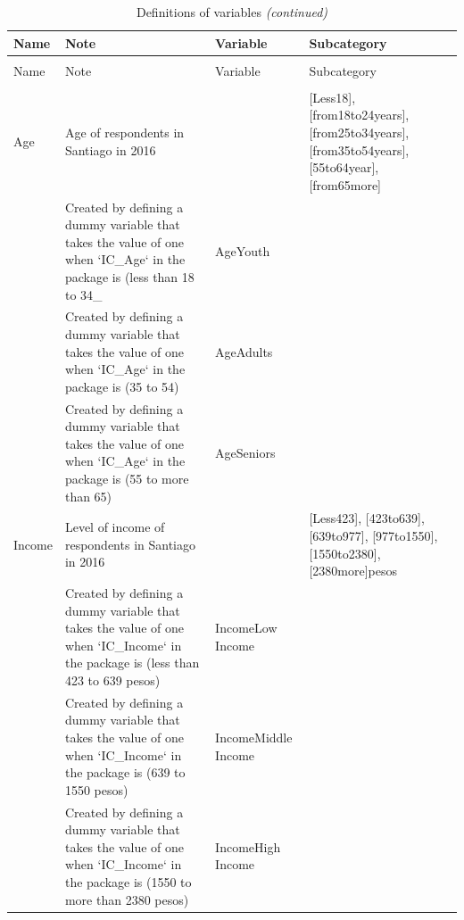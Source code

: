 \documentclass[
11pt, %
oneside, %
english, %
singlespacing, %
]{macthesis} %
\begin{document}
\begingroup\fontsize{8}{10}\selectfont
\begin{longtable}[t]{l>{\raggedright\arraybackslash}p{10em}>{\raggedright\arraybackslash}p{10em}>{\raggedright\arraybackslash}p{10em}}
\caption{\label{tab:unnamed-chunk-21}\label{tab:Definitions}Definitions of variables}\\
\toprule
Name & Note & Variable & Subcategory\\
\midrule
\endfirsthead
\caption[]{\label{tab:unnamed-chunk-21}Definitions of variables \textit{(continued)}}\\
\toprule
Name & Note & Variable & Subcategory\\
\midrule
\endhead

\endfoot
\bottomrule
\endlastfoot
\addlinespace[0.3em]
\multicolumn{4}{l}{\textbf{Socio-Economic and Demographic Attributes}}\\
\hspace{1em}Age & Age of respondents in Santiago in 2016 &  & {}[Less18], [from18to24years], [from25to34years], [from35to54years], [55to64year], [from65more]\\
\hspace{1em} & Created by defining a dummy variable that takes the value of one when `IC\_Age` in the package is (less than 18 to 34\_ & AgeYouth & \\
\hspace{1em} & Created by defining a dummy variable that takes the value of one when `IC\_Age` in the package is (35 to 54) & AgeAdults & \\
\hspace{1em} & Created by defining a dummy variable that takes the value of one when `IC\_Age` in the package is (55 to more than 65) & AgeSeniors & \\
\hspace{1em}Income & Level of income of respondents in Santiago in 2016 &  & {}[Less423], [423to639], [639to977], [977to1550], [1550to2380], [2380more]pesos\\
\hspace{1em} & Created by defining a dummy variable that takes the value of one when `IC\_Income` in the package is (less than 423 to 639 pesos) & IncomeLow Income & \\
\hspace{1em} & Created by defining a dummy variable that takes the value of one when `IC\_Income` in the package is (639 to 1550 pesos) & IncomeMiddle Income & \\
\hspace{1em} & Created by defining a dummy variable that takes the value of one when `IC\_Income` in the package is (1550 to more than 2380 pesos) & IncomeHigh Income & \\

\end{longtable}
\end{document}
